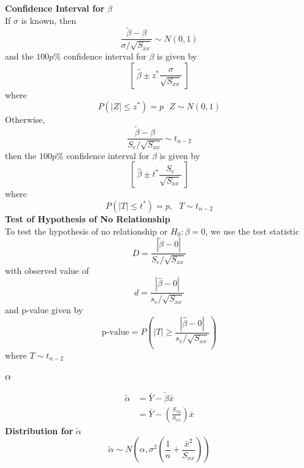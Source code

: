 \documentclass[12pt, leqno]{article}
\theoremstyle{definition}
\begin{document}
  \textbf{Confidence Interval for} $\beta$ \\
  If $\sigma$ is known, then
  $$\frac{\widetilde{\beta} - \beta}{\sigma / \sqrt{S_{xx}}} \sim N(0, 1)$$
  and the $100p\%$ confidence interval for $\beta$ is given by
  $$\left[~ \hat{\beta} \pm z^{*}\frac{\sigma}{\sqrt{S_{xx}}} ~\right]$$
  where
  $$P(|Z| \leq z^{*}) = p ~~~ Z \sim N(0, 1)$$
  \newline
  Otherwise,
  $$\frac{\widetilde{\beta} - \beta}{S_{e} / \sqrt{S_{xx}}} \sim t_{n-2}$$
  then the $100p\%$ confidence interval for $\beta$ is given by
  $$\left[~ \hat{\beta} \pm t^{*}\frac{S_{e}}{\sqrt{S_{xx}}} ~\right]$$
  where
  $$P(|T| \leq t^{*}) = p, ~~~ T \sim t_{n-2}$$
  \newline
  \textbf{Test of Hypothesis of No Relationship} \\
  To test the hypothesis of no relationship or $H_{0}: \beta = 0$, we use the test statistic
  $$D = \frac{|\widetilde{\beta} - 0|}{S_{e} / \sqrt{S_{xx}}}$$
  with observed value of
  $$d = \frac{|\hat{\beta} - 0|}{s_{e} / \sqrt{S_{xx}}}$$
  and p-value given by
  $$\text{p-value} = P\left(|T| \geq \frac{|\hat{\beta} - 0|}{s_{e} / \sqrt{S_{xx}}}\right)$$
  where $T \sim t_{n-2}$

  \subsubsection{$\alpha$}
  \begin{align*}
  \widetilde{\alpha} &= \bar{Y} - \widetilde{\beta}\bar{x} \\
  &= \bar{Y} - \left(\frac{S_{xy}}{S_{xx}}\right)\bar{x}
  \end{align*}
  \textbf{Distribution for } $\widetilde{\alpha}$ \\
  $$\widetilde{\alpha} \sim N\left(\alpha, \sigma^{2}\left(\frac{1}{n} + \frac{\bar{x}^{2}}{S_{xx}}\right)\right)$$
\end{document}
